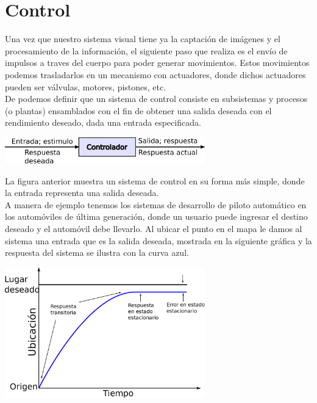 \section{Control}
Una vez que nuestro sistema visual tiene ya la captación de imágenes y el procesamiento de
la información, el siguiente paso que realiza es el envío de impulsos a traves del cuerpo para
poder generar movimientos. Estos movimientos podemos trasladarlos en un mecanismo con actuadores,
donde dichos actuadores pueden ser válvulas, motores, pistones, etc.\\
De \cite{Book:Nise2010} podemos definir que un sistema de control consiste en subsistemas y procesos
(o plantas) ensamblados con el fin de obtener una salida deseada con el rendimiento deseado, dada una
entrada especificada.
\begin{center}
	\includegraphics[width=0.65\textwidth]{Contenido/Cuerpo/Capitulo2/Fig22.eps}
	\label{fig:MarcoTeorico:Fig25}
\end{center}
La figura anterior muestra un sistema de control en su forma más simple, donde la entrada representa
una salida deseada.\\
A manera de ejemplo tenemos los sistemas de desarrollo de piloto automático en los automóviles de
última generación, donde un usuario puede ingresar el destino deseado y el automóvil debe llevarlo.
Al ubicar el punto en el mapa le damos al sistema una entrada que es la salida deseada, mostrada
en la siguiente gráfica y la respuesta del sistema se ilustra con la curva azul.
\begin{center}
	\includegraphics[width=0.65\textwidth]{Contenido/Cuerpo/Capitulo2/Fig23.eps}
	\label{fig:MarcoTeorico:Fig25}
\end{center}

